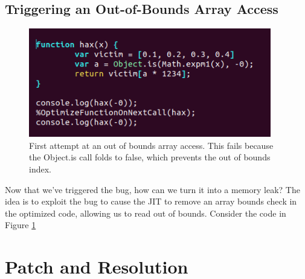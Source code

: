 \documentclass[11pt]{article}
\begin{document}
\subsection{Triggering an Out-of-Bounds Array Access}
\begin{figure}
	\centering
	\includegraphics[width=300pt]{example3.png}
	\caption{First attempt at an out of bounds array access. This fails because the Object.is
	call folds to false, which prevents the out of bounds index.}
  \label{fig:example3}
\end{figure}
Now that we've triggered the bug, how can we turn it into a memory leak? The idea is to exploit the
bug to cause the JIT to remove an array bounds check in the optimized code, allowing us to read out
of bounds. Consider the code in Figure \ref{fig:example3} 
\section{Patch and Resolution}
\end{document}
